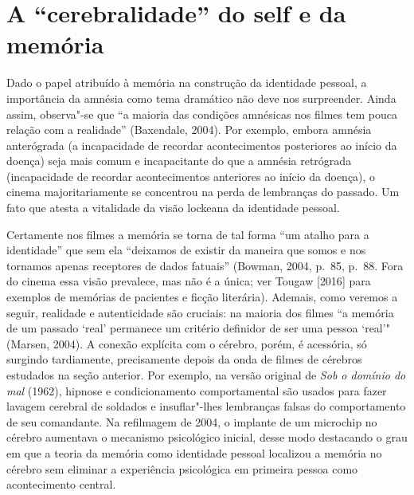 \chapter{A ``cerebralidade'' do self e da memória}

Dado o papel atribuído à memória na construção da identidade pessoal, a
importância da amnésia como tema dramático não deve nos surpreender.
Ainda assim, observa"-se que ``a maioria das condições amnésicas nos
filmes tem pouca relação com a realidade'' (Baxendale, 2004). Por
exemplo, embora amnésia anterógrada (a incapacidade de recordar
acontecimentos posteriores ao início da doença) seja mais comum e
incapacitante do que a amnésia retrógrada (incapacidade de recordar
acontecimentos anteriores ao início da doença), o cinema
majoritariamente se concentrou na perda de lembranças do passado. Um
fato que atesta a vitalidade da visão lockeana da identidade pessoal.

Certamente nos filmes a memória se torna de tal forma ``um atalho para a
identidade'' que sem ela ``deixamos de existir da maneira que somos e
nos tornamos apenas receptores de dados fatuais'' (Bowman, 2004, p.~85,
p.~88. Fora do cinema essa visão prevalece, mas não é a única; ver Tougaw
{[}2016{]} para exemplos de memórias de pacientes e ficção literária).
Ademais, como veremos a seguir, realidade e autenticidade são cruciais:
na maioria dos filmes ``a memória de um passado `real' permanece um
critério definidor de ser uma pessoa `real'" (Marsen, 2004). A conexão
explícita com o cérebro, porém, é acessória, só surgindo tardiamente,
precisamente depois da onda de filmes de cérebros estudados na seção
anterior. Por exemplo, na versão original de \emph{Sob o domínio do mal}
(1962), hipnose e condicionamento comportamental são usados para fazer
lavagem cerebral de soldados e insuflar"-lhes lembranças falsas do
comportamento de seu comandante. Na refilmagem de 2004, o implante de um
microchip no cérebro aumentava o mecanismo psicológico inicial, desse
modo destacando o grau em que a teoria da memória como identidade
pessoal localizou a memória no cérebro sem eliminar a experiência
psicológica em primeira pessoa como acontecimento central.

